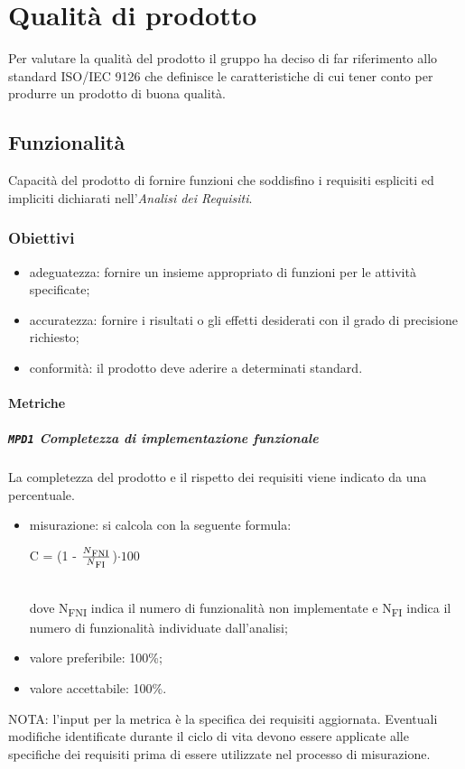 \section{Qualità di prodotto}
Per valutare la qualità del prodotto il gruppo ha deciso di far riferimento allo standard ISO/IEC 9126 che definisce le caratteristiche di cui tener conto per produrre un prodotto di buona qualità.
	\subsection{Funzionalità}
	Capacità del prodotto di fornire funzioni che soddisfino i requisiti espliciti ed impliciti dichiarati nell'\textit{Analisi dei Requisiti}.
		\subsubsection{Obiettivi}
		\begin{itemize}
			\item adeguatezza: fornire un insieme appropriato di funzioni per le attività specificate;
			\item accuratezza: fornire i risultati o gli effetti desiderati con il grado di precisione richiesto;
			\item conformità: il prodotto deve aderire a determinati standard. %
		\end{itemize}
		\paragraph{Metriche}
			\subparagraph{\texttt{MPD1} Completezza di implementazione funzionale}
			La completezza del prodotto e il rispetto dei requisiti viene indicato da una percentuale.
			\begin{itemize}
			\item misurazione: si calcola con la seguente formula: \\
			\centerline { C = (1 - \(\frac{N\textsubscript{FNI}}{N\textsubscript{FI}} \))$ \cdot  100$ } \\
			dove N\textsubscript{FNI} indica il numero di funzionalità non implementate e N\textsubscript{FI} indica il numero di funzionalità individuate dall'analisi;
			\item valore preferibile: 100\%;
			\item valore accettabile: 100\%.
			\end{itemize}
			NOTA: l'input per la metrica è la specifica dei requisiti aggiornata. Eventuali modifiche identificate durante il ciclo di vita devono essere applicate alle specifiche dei requisiti prima di essere utilizzate nel processo di misurazione.
